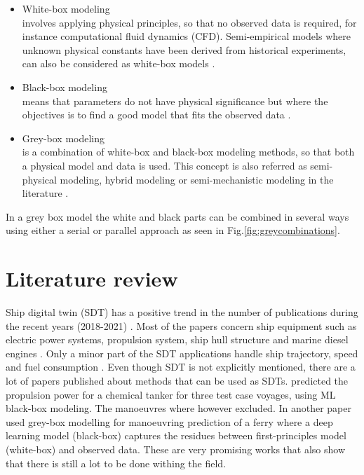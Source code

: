 \begin{itemize}
    \item White-box modeling \\
    involves applying physical principles, so that no observed data is required, for instance computational fluid dynamics (CFD). Semi-empirical models where unknown physical constants have been derived from historical experiments, can also be considered as white-box models \cite{leifsson_grey-box_2008}.  

    \item Black-box modeling \\
    means that parameters do not have physical significance but where the objectives is to find a good model that fits the observed data \cite{lindskog_tools_1995}.
    
    \item Grey-box modeling \\
    is a combination of white-box and black-box modeling methods, so that both a physical model and data is used. This concept is also referred as semi-physical modeling, hybrid modeling or semi-mechanistic modeling in the literature \cite{leifsson_grey-box_2008}. 
\end{itemize}

\noindent In a grey box model the white and black parts can be combined in several ways using either a serial or parallel approach \cite{leifsson_grey-box_2008} as seen in Fig.\ref{fig:greycombinations}. 



\section{Literature review}
Ship digital twin (SDT) has a positive trend in the number of publications during the recent years (2018-2021)  \cite{assani_ships_2022}. Most of the papers concern ship equipment such as electric power systems, propulsion system, ship hull structure and marine diesel engines \cite{assani_ships_2022}. Only a minor part of the SDT applications handle ship trajectory, speed and fuel consumption \cite{assani_ships_2022}.   
Even though SDT is not explicitly mentioned, there are a lot of papers published about methods that can be used as SDTs. \cite{lang_comparison_2022} predicted the propulsion power for a chemical tanker for three test case voyages, using ML black-box modeling. The manoeuvres where however excluded. In another paper \cite{nielsen_machine_2022} used grey-box modelling for manoeuvring prediction of a ferry where a deep learning model (black-box) captures the residues between first-principles model (white-box) and observed data. These are very promising works that also show that there is still a lot to be done withing the field. 

